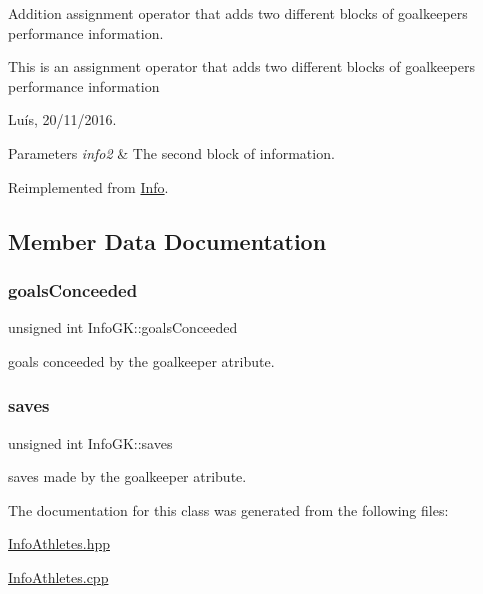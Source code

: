 Addition assignment operator that adds two different blocks of goalkeeper\textquotesingle{}s performance information. 

This is an assignment operator that adds two different blocks of goalkeeper\textquotesingle{}s performance information

Luís, 20/11/2016. 


\begin{DoxyParams}{Parameters}
{\em info2} & The second block of information. \\
\hline
\end{DoxyParams}


Reimplemented from \hyperlink{class_info_a35d820d35f8ab3b8de15cdfc07f0c5a4}{Info}.



\subsection{Member Data Documentation}
\hypertarget{class_info_g_k_a1380b4f12dffe7a8cadd23e06e5c645f}{}\label{class_info_g_k_a1380b4f12dffe7a8cadd23e06e5c645f} 
\subsubsection{\texorpdfstring{goals\+Conceeded}{goalsConceeded}}
{\footnotesize\ttfamily unsigned int Info\+G\+K\+::goals\+Conceeded\hspace{0.3cm}{\ttfamily [protected]}}



goals conceeded by the goalkeeper atribute. 

\hypertarget{class_info_g_k_a0cd48fb9138effb26433639f12311794}{}\label{class_info_g_k_a0cd48fb9138effb26433639f12311794} 
\subsubsection{\texorpdfstring{saves}{saves}}
{\footnotesize\ttfamily unsigned int Info\+G\+K\+::saves\hspace{0.3cm}{\ttfamily [protected]}}



saves made by the goalkeeper atribute. 



The documentation for this class was generated from the following files\+:\begin{DoxyCompactItemize}
\item 
\hyperlink{_info_athletes_8hpp}{Info\+Athletes.\+hpp}\item 
\hyperlink{_info_athletes_8cpp}{Info\+Athletes.\+cpp}\end{DoxyCompactItemize}
